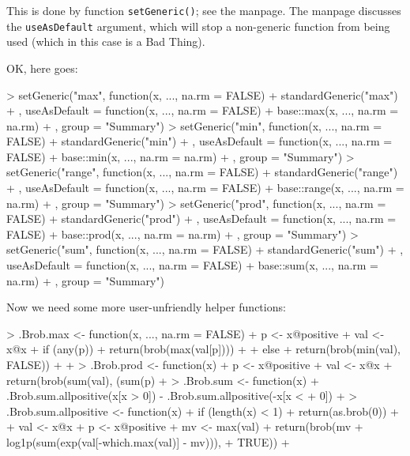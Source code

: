 \documentclass[a4paper]{article}
\begin{document}
This is done by function {\tt setGeneric()}; see the manpage.  The
manpage discusses the {\tt useAsDefault} argument, which will stop a
non-generic function from being used (which in this case is a Bad
Thing).

OK, here goes:

\begin{Schunk}
\begin{Sinput}
> setGeneric("max", function(x, ..., na.rm = FALSE) {
+     standardGeneric("max")
+ }, useAsDefault = function(x, ..., na.rm = FALSE) {
+     base::max(x, ..., na.rm = na.rm)
+ }, group = "Summary")
> setGeneric("min", function(x, ..., na.rm = FALSE) {
+     standardGeneric("min")
+ }, useAsDefault = function(x, ..., na.rm = FALSE) {
+     base::min(x, ..., na.rm = na.rm)
+ }, group = "Summary")
> setGeneric("range", function(x, ..., na.rm = FALSE) {
+     standardGeneric("range")
+ }, useAsDefault = function(x, ..., na.rm = FALSE) {
+     base::range(x, ..., na.rm = na.rm)
+ }, group = "Summary")
> setGeneric("prod", function(x, ..., na.rm = FALSE) {
+     standardGeneric("prod")
+ }, useAsDefault = function(x, ..., na.rm = FALSE) {
+     base::prod(x, ..., na.rm = na.rm)
+ }, group = "Summary")
> setGeneric("sum", function(x, ..., na.rm = FALSE) {
+     standardGeneric("sum")
+ }, useAsDefault = function(x, ..., na.rm = FALSE) {
+     base::sum(x, ..., na.rm = na.rm)
+ }, group = "Summary")
\end{Sinput}
\end{Schunk}

Now we need some more user-unfriendly helper functions:

\begin{Schunk}
\begin{Sinput}
> .Brob.max <- function(x, ..., na.rm = FALSE) {
+     p <- x@positive
+     val <- x@x
+     if (any(p)) {
+         return(brob(max(val[p])))
+     }
+     else {
+         return(brob(min(val), FALSE))
+     }
+ }
> .Brob.prod <- function(x) {
+     p <- x@positive
+     val <- x@x
+     return(brob(sum(val), (sum(p)%%2) == 0))
+ }
> .Brob.sum <- function(x) {
+     .Brob.sum.allpositive(x[x > 0]) - .Brob.sum.allpositive(-x[x < 
+         0])
+ }
> .Brob.sum.allpositive <- function(x) {
+     if (length(x) < 1) {
+         return(as.brob(0))
+     }
+     val <- x@x
+     p <- x@positive
+     mv <- max(val)
+     return(brob(mv + log1p(sum(exp(val[-which.max(val)] - mv))), 
+         TRUE))
+ }
\end{Sinput}
\end{Schunk}
\end{document}
